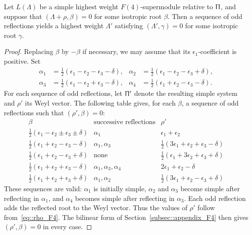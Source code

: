 \begin{lemma}
\label{lemm::F4_odd_reflections_and_kernel}
Let $L(\Lambda)$ be a simple highest weight $F(4)$-supermodule relative to $\Uppi$, and suppose that $(\Lambda+\rho,\beta)=0$ for some isotropic root $\beta$. Then a sequence of odd reflections yields a highest weight $\Lambda'$ satisfying $(\Lambda',\gamma)=0$ for some isotropic root $\gamma$.
\end{lemma}

\begin{proof}
Replacing $\beta$ by $-\beta$ if necessary, we may assume that its $\epsilon_1$-coefficient is positive. Set
\begin{equation*}
\begin{aligned}
\alpha_1&=\frac12(\epsilon_1-\epsilon_2-\epsilon_3-\delta),
&\alpha_2&=\frac12(\epsilon_1-\epsilon_2-\epsilon_3+\delta),\\
\alpha_3&=\frac12(\epsilon_1-\epsilon_2+\epsilon_3-\delta),
&\alpha_4&=\frac12(\epsilon_1+\epsilon_2-\epsilon_3-\delta).
\end{aligned}
\end{equation*}
For each sequence of odd reflections, let $\Uppi'$ denote the resulting simple system and $\rho'$ its Weyl vector. The following table gives, for each $\beta$, a sequence of odd reflections such that $(\rho',\beta)=0$:
\begin{equation*}
\begin{array}{c|c|c}
\beta & \text{successive reflections} & \rho' \\ \hline
\frac12(\epsilon_1-\epsilon_2\pm\epsilon_3\pm\delta)
& \alpha_1
& \epsilon_1+\epsilon_2 \\[2pt]
\frac12(\epsilon_1+\epsilon_2-\epsilon_3-\delta)
& \alpha_1,\alpha_3
& \frac12(3\epsilon_1+\epsilon_2+\epsilon_3-\delta) \\[2pt]
\frac12(\epsilon_1+\epsilon_2-\epsilon_3+\delta)
& \text{none}
& \frac12(\epsilon_1+3\epsilon_2+\epsilon_3+\delta) \\[2pt]
\frac12(\epsilon_1+\epsilon_2+\epsilon_3-\delta)
& \alpha_1,\alpha_3,\alpha_4
& 2\epsilon_1+\epsilon_2-\delta \\[2pt]
\frac12(\epsilon_1+\epsilon_2+\epsilon_3+\delta)
& \alpha_1,\alpha_2
& \frac12(3\epsilon_1+\epsilon_2-\epsilon_3+\delta)
\end{array}
\end{equation*}
These sequences are valid: $\alpha_1$ is initially simple, $\alpha_2$ and $\alpha_3$ become simple after reflecting in $\alpha_1$, and $\alpha_4$ becomes simple after reflecting in $\alpha_3$. Each odd reflection adds the reflected root to the Weyl vector. Thus the values of $\rho'$ follow from~\eqref{eq::rho_F4}. The bilinear form of Section~\ref{subsec::appendix_F4} then gives $(\rho',\beta)=0$ in every case.


\end{proof}
